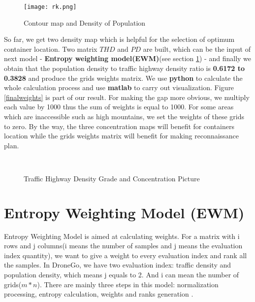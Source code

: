 \documentclass{mcmthesis}
\begin{document}
       \begin{figure}[!htbp]                                         
    	\centering
    	\texttt{[image: rk.png]}      
    	\caption{ Contour map and Density of Population }                            
    	\label{cmdp}                                          
    \end{figure}
    So far, we get two density map which is helpful for the selection of optimum container location. Two matrix $THD$ and $PD$ are built, which can be the input of next model - \textbf{Entropy weighting model(EWM)}(see section \ref{EWM}) - and finally we obtain that the population density to traffic highway density ratio is \textbf{0.6172 to 0.3828} and produce the grids weights matrix. 
     We use \textbf{python} to calculate the whole calculation process and use \textbf{matlab} to carry out visualization. Figure \ref{finalweights} is part of our result. For making the gap more obvious, we multiply each value by 1000 thus the sum of weights is equal to 1000. For some areas which are inaccessible such as high mountains, we set the weights of these grids to zero. By the way, the three concentration maps will benefit for containers location while the grids weights matrix will benefit for making reconnaissance plan. 
    	   \begin{figure}[!htbp]                               
    	\centering
    	\qquad
    	\\ 
    	\caption{Traffic Highway Density Grade and Concentration Picture}                             
    \end{figure}

    \section{Entropy Weighting Model (EWM)} 
    \label{EWM}
      Entropy Weighting Model is aimed at calculating weights. For a matrix with i rows and j columns(i means the number of samples and j means the evaluation index quantity), we want to give a weight to every evaluation index and rank all the samples. In DroneGo, we have two evaluation index: traffic density and population density, which means j equals to 2. And i can mean the number of grids($m*n$).
    There are mainly three steps in this model: normalization processing, entropy calculation, weights and ranks generation \cite{5}.
\end{document}
